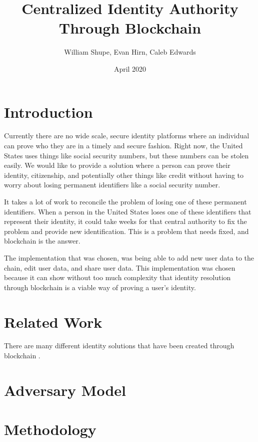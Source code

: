 \documentclass[letterpaper, 10 pt, conference]{ieeeconf}  %
\title{Centralized Identity Authority Through Blockchain}
\author{William Shupe, Evan Hirn, Caleb Edwards}
\date{April 2020}
\begin{document}
\maketitle

\section{Introduction}

Currently there are no wide scale, secure identity platforms where an individual can prove who they are in a timely and secure fashion. Right now, the United States uses things like social security numbers, but these numbers can be stolen easily. We would like to provide a solution where a person can prove their identity, citizenship, and potentially
other things like credit without having to worry about losing permanent identifiers like a social security number.

It takes a lot of work to reconcile the problem of losing one of these permanent identifiers. When a person in the United States loses one of these identifiers that represent their identity, it could take weeks for that central authority to fix the problem and provide new identification. This is a problem that needs fixed, and blockchain is the answer.

The implementation that was chosen, was being able to add new user data to the chain, edit user data, and share user data. This implementation was chosen because it can show without too much complexity that identity resolution through blockchain is a viable way of proving a user's identity. 

\section{Related Work}

There are many different identity solutions that have been created through blockchain \cite{1}.

\section{Adversary Model}

\section{Methodology}
\end{document}
